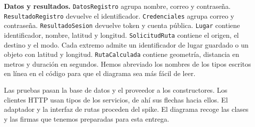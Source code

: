 \documentclass[10pt,a4paper]{article}
\begin{document}
\begin{center}
\end{center}

\textbf{Datos y resultados.}
\texttt{DatosRegistro} agrupa nombre, correo y contraseña.
\texttt{ResultadoRegistro} devuelve el identificador.
\texttt{Credenciales} agrupa correo y contraseña.
\texttt{ResultadoSesion} devuelve token y cuenta pública.
\texttt{Lugar} contiene identificador, nombre, latitud y longitud.
\texttt{SolicitudRuta} contiene el origen, el destino y el modo. Cada extremo admite un identificador de lugar guardado o un objeto con latitud y longitud.
\texttt{RutaCalculada} contiene geometría, distancia en metros y duración en segundos.
Hemos abreviado los nombres de los tipos escritos en línea en el código para que el diagrama sea más fácil de leer.

Las pruebas pasan la base de datos y el proveedor a los constructores. Los clientes HTTP usan tipos de los servicios, de ahí sus flechas hacia ellos. El adaptador y la interfaz de rutas proceden del spike. El diagrama recoge las clases y las firmas que tenemos preparadas para esta entrega.
\end{document}
